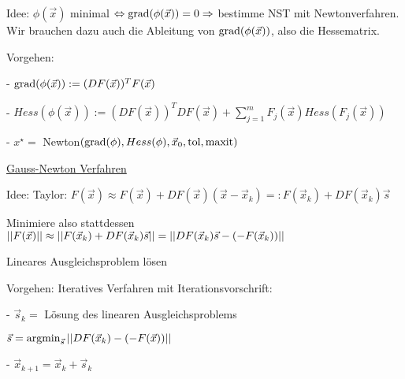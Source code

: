 Idee: $\phi(\vec{x})$ minimal $\Leftrightarrow \text{grad} (\phi(\vec{x})) = 0 \Rightarrow$
bestimme NST mit Newtonverfahren. Wir brauchen dazu auch die Ableitung von
$\text{grad} (\phi(\vec{x}))$, also die Hessematrix.

Vorgehen:

- $\text{grad} (\phi(\vec{x})) := (DF( \vec{x}))^T F(\vec{x})$

- $Hess (\phi(\vec{x})) := (DF(\vec{x}))^T DF(\vec{x}) + \sum_{j=1}^{m} F_j (\vec{x}) Hess(F_j(\vec{x}))$

- $x^\star =$ Newton$(\text{grad}(\phi) , Hess(\phi) , \vec{x}_0 , \text{tol} , \text{maxit})$

\vspace{1\baselineskip}

\underline{Gauss-Newton Verfahren}

Idee: Taylor: $F(\vec{x}) \approx F(\vec{x}) + DF(\vec{x})(\vec{x} - \vec{x}_k) =:
F(\vec{x}_k) + DF(\vec{x}_k) \vec{s}$

Minimiere also stattdessen $\left\vert\left\vert F(\vec{x}) \right\vert\right\vert \approx \left\vert\left\vert F(\vec{x}_k) + DF(\vec{x}_k) \vec{s} \right\vert\right\vert
= \left\vert\left\vert DF(\vec{x}_k) \vec{s} - (- F(\vec{x}_k)) \right\vert\right\vert$

Lineares Ausgleichsproblem lösen

Vorgehen:
Iteratives Verfahren mit Iterationsvorschrift:

- $\vec{s}_k =$ Lösung des linearen Ausgleichsproblems

$\vec{s} = \text{argmin}_{\vec{s}} \left\vert\left\vert DF(\vec{x}_k) - (- F(\vec{x})) \right\vert\right\vert$

- $\vec{x}_{k+1} = \vec{x}_k + \vec{s}_k$





